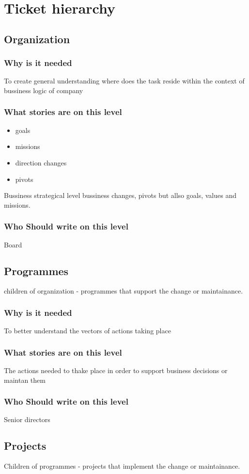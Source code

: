 \section{Ticket hierarchy}
\subsection{Organization}
\subsubsection{Why is it needed}
To create general understanding  where does the task reside within the context of bussiness logic of company
\subsubsection{What stories are on this level}
\begin{itemize}
    \item goals
    \item missions
    \item direction changes
    \item pivots
\end{itemize}
Bussiness strategical level bussiness changes, pivots but allso goals, values and missions.
\subsubsection{Who Should write on this level}
Board
\subsection{Programmes}
children of organization - programmes that support the change or maintainance.
\subsubsection{Why is it needed}
To better understand the vectors of actions taking place
\subsubsection{What stories are on this level}
The actions needed to thake place in order to support business decisions or maintan them
\subsubsection{Who Should write on this level}
Senior directors
\subsection{Projects}
Children of programmes - projects that implement the change or maintainance.
